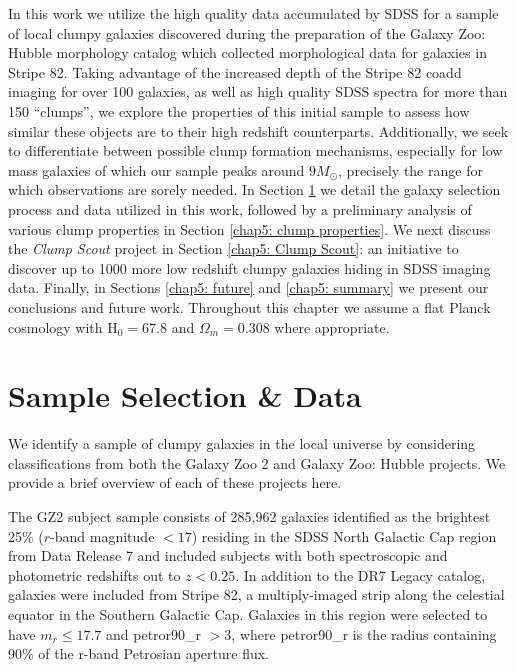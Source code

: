 In this work we utilize the high quality data accumulated by SDSS for a sample of local clumpy galaxies discovered during the preparation of the Galaxy Zoo: Hubble morphology catalog which collected morphological data for galaxies in Stripe 82. Taking advantage of the increased depth of the Stripe 82 coadd imaging for over 100 galaxies, as well as high quality SDSS spectra for more than 150 ``clumps'', we explore the properties of this initial sample to assess how similar these objects are to their high redshift counterparts. Additionally, we seek to differentiate between possible clump formation mechanisms, especially for low mass galaxies of which our sample peaks around $9M_{\odot}$, precisely the range for which observations are sorely needed. In Section \ref{chap5: data} we detail the galaxy selection process and data utilized in this work, followed by a preliminary analysis of various clump properties in Section \ref{chap5: clump properties}. We next discuss the \textit{Clump Scout} project in Section \ref{chap5: Clump Scout}: an initiative to discover up to 1000 more low redshift clumpy galaxies hiding in SDSS imaging data. Finally, in Sections \ref{chap5: future} and \ref{chap5: summary} we present our conclusions and future work. Throughout this chapter we assume a flat Planck cosmology \citep{Planck2016} with H$_0=67.8$ and $\Omega_m = 0.308$ where appropriate. 


\section{Sample Selection \& Data} \label{chap5: data}

We identify a sample of clumpy galaxies in the local universe by considering classifications from both the Galaxy Zoo 2 \citep[GZ2][]{Willett2013} and Galaxy Zoo: Hubble \citep[GZH][]{Willett2017} projects. We provide a brief overview of each of these projects here. 

The GZ2 subject sample consists of 285,962 galaxies identified as the brightest 25\% ($r$-band magnitude $< 17$) residing in the SDSS North Galactic Cap region from Data Release 7 and included subjects with both spectroscopic and photometric redshifts out to $z < 0.25$. In addition to the DR7 Legacy catalog, galaxies were included from Stripe 82, a multiply-imaged strip along the celestial equator in the Southern Galactic Cap. Galaxies in this region were selected to have $m_r\le17.7$ and petror90\_r $>3$, where petror90\_r is the radius containing 90\% of the r-band Petrosian aperture flux.


